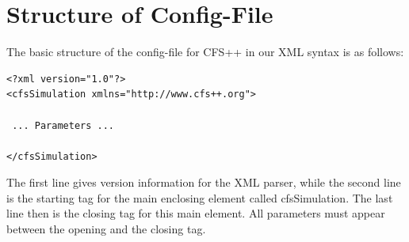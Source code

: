 \chapter{Structure of Config-File}
\label{sec:general}
%
%
The basic structure of the config-file for CFS++ in our XML
syntax is as follows:

\begin{verbatim}
<?xml version="1.0"?>
<cfsSimulation xmlns="http://www.cfs++.org">

 ... Parameters ...

</cfsSimulation>
\end{verbatim}

The first line gives version information for the XML parser, while the
second line is the starting tag for the main enclosing element called
cfsSimulation.  The last line then is the closing tag for this main
element. All parameters must appear between the opening and the
closing tag.

